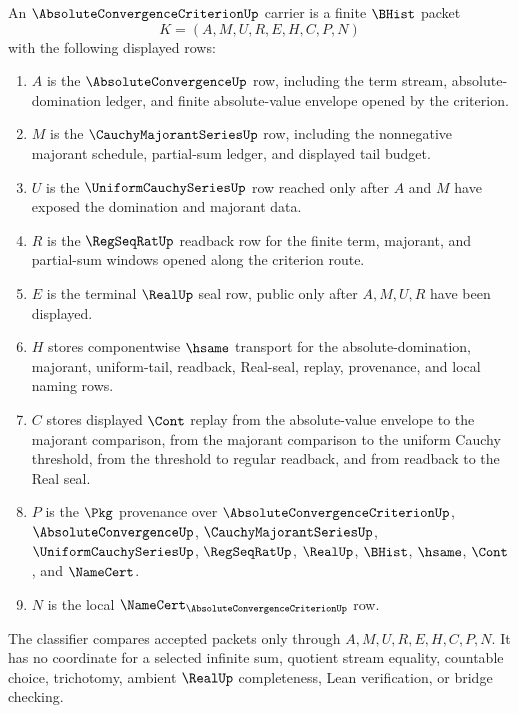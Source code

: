 \begin{definition}\label{def:absolute-convergence-criterion-carrier}
An $\AbsoluteConvergenceCriterionUp$ carrier is a finite $\BHist$ packet
$$
K=(A,M,U,R,E,H,C,P,N)
$$
with the following displayed rows:
\begin{enumerate}
\item $A$ is the $\AbsoluteConvergenceUp$ row, including the term stream, absolute-domination ledger, and finite absolute-value envelope opened by the criterion.
\item $M$ is the $\CauchyMajorantSeriesUp$ row, including the nonnegative majorant schedule, partial-sum ledger, and displayed tail budget.
\item $U$ is the $\UniformCauchySeriesUp$ row reached only after $A$ and $M$ have exposed the domination and majorant data.
\item $R$ is the $\RegSeqRatUp$ readback row for the finite term, majorant, and partial-sum windows opened along the criterion route.
\item $E$ is the terminal $\RealUp$ seal row, public only after $A,M,U,R$ have been displayed.
\item $H$ stores componentwise $\hsame$ transport for the absolute-domination, majorant, uniform-tail, readback, Real-seal, replay, provenance, and local naming rows.
\item $C$ stores displayed $\Cont$ replay from the absolute-value envelope to the majorant comparison, from the majorant comparison to the uniform Cauchy threshold, from the threshold to regular readback, and from readback to the Real seal.
\item $P$ is the $\Pkg$ provenance over $\AbsoluteConvergenceCriterionUp$, $\AbsoluteConvergenceUp$, $\CauchyMajorantSeriesUp$, $\UniformCauchySeriesUp$, $\RegSeqRatUp$, $\RealUp$, $\BHist$, $\hsame$, $\Cont$, and $\NameCert$.
\item $N$ is the local $\NameCert_{\AbsoluteConvergenceCriterionUp}$ row.
\end{enumerate}
The classifier compares accepted packets only through $A,M,U,R,E,H,C,P,N$. It has no coordinate for a selected infinite sum, quotient stream equality, countable choice, trichotomy, ambient $\RealUp$ completeness, Lean verification, or bridge checking.
\end{definition}

